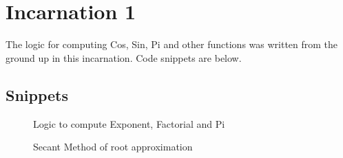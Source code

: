 \section{Incarnation 1}
  \begin{flushleft}
    The logic for computing Cos, Sin, Pi and other functions was written from the ground up in this incarnation. Code snippets are below.
  \end{flushleft}
  \subsection{Snippets}
  \vspace{2em}
    \begin{figure}[h!]
      \centering
      \caption{Logic to compute Exponent, Factorial and Pi}
      \label{fig:Math Library}
    \end{figure}
    \pagebreak
    \begin{figure}[h!]
      \centering
      \caption{Secant Method of root approximation}
      \label{fig:Root Approximation}
    \end{figure}


